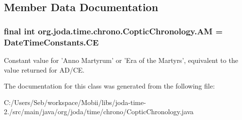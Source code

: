 \subsection{Member Data Documentation}
\hypertarget{classorg_1_1joda_1_1time_1_1chrono_1_1_coptic_chronology_a8de4d760b512dce36009b0507c2410fa}{
\subsubsection[{A\-M}]{\setlength{\rightskip}{0pt plus 5cm}final int org.\-joda.\-time.\-chrono.\-Coptic\-Chronology.\-A\-M = {\bf Date\-Time\-Constants.\-C\-E}\hspace{0.3cm}{\ttfamily [static]}}}\label{classorg_1_1joda_1_1time_1_1chrono_1_1_coptic_chronology_a8de4d760b512dce36009b0507c2410fa}
Constant value for 'Anno Martyrum' or 'Era of the Martyrs', equivalent to the value returned for A\-D/\-C\-E. 

The documentation for this class was generated from the following file\-:\begin{DoxyCompactItemize}
\item 
C\-:/\-Users/\-Seb/workspace/\-Mobii/libs/joda-\/time-\/2./src/main/java/org/joda/time/chrono/Coptic\-Chronology.\-java\end{DoxyCompactItemize}
